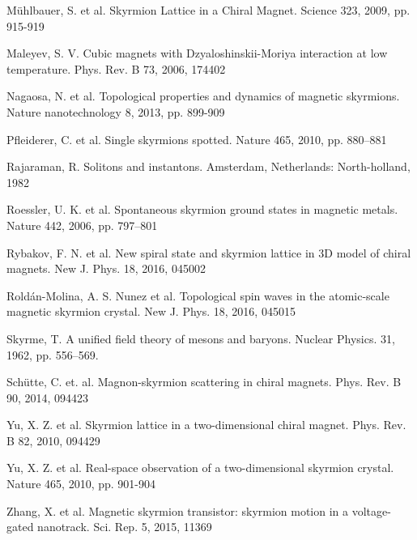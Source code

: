 \documentclass[a4paper,article,14pt]{extarticle}
\begin{document}
\begin{thebibliography}{1}
 Mühlbauer, S. et al. \flqq Skyrmion Lattice in a Chiral Magnet\frqq. Science 323, 2009, pp. 915-919

 Maleyev, S. V. \flqq Cubic magnets with Dzyaloshinskii-Moriya interaction at low temperature\frqq. Phys. Rev. B  73, 2006, 174402

 Nagaosa, N. et al. \flqq Topological properties and dynamics of magnetic skyrmions\frqq. Nature nanotechnology 8, 2013, pp. 899-909

 Pfleiderer, C. et al. \flqq Single skyrmions spotted\frqq. Nature 465, 2010, pp. 880–881

 Rajaraman, R. \flqq Solitons and instantons\frqq. Amsterdam, Netherlands: North-holland, 1982

 Roessler, U. K. et al. \flqq Spontaneous skyrmion ground
states in magnetic metals\frqq. Nature 442, 2006, pp. 797–801

 Rybakov, F. N. et al. \flqq New spiral state and skyrmion lattice in 3D model of chiral magnets\frqq. New J. Phys. 18, 2016, 045002

 Roldán-Molina, A. S. Nunez et al. \flqq Topological spin waves in the atomic-scale magnetic skyrmion crystal\frqq. New J. Phys. 18, 2016, 045015

 Skyrme, T. \flqq A unified field theory of mesons and baryons\frqq. Nuclear Physics. 31, 1962, pp. 556–569.

 Sch{\"u}tte, C. et. al. \flqq Magnon-skyrmion scattering in chiral magnets\frqq. Phys. Rev. B 90, 2014, 094423 

 Yu, X. Z. et al. \flqq Skyrmion lattice in a two-dimensional chiral magnet\frqq. Phys. Rev. B 82, 2010, 094429

 Yu, X. Z. et al. \flqq Real-space observation of a two-dimensional skyrmion crystal\frqq. Nature 465, 2010, pp. 901-904

 Zhang, X. et al. \flqq Magnetic skyrmion transistor: skyrmion motion in a voltage-gated nanotrack\frqq. Sci. Rep. 5, 2015, 11369

\end{thebibliography}
\end{document}
